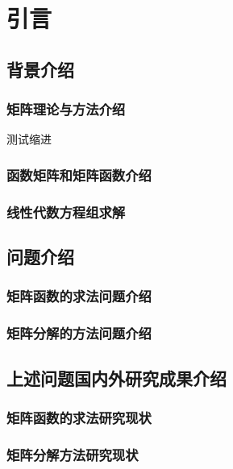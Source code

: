 \section{引言}
\fontsize{12pt}{14pt}\selectfont
\songti
    \subsection{背景介绍}
        \subsubsection{矩阵理论与方法介绍}
            \par 测试缩进 


        \subsubsection{函数矩阵和矩阵函数介绍}



        \subsubsection{线性代数方程组求解}


        
    \subsection{问题介绍}
        \subsubsection{矩阵函数的求法问题介绍}

        

        \subsubsection{矩阵分解的方法问题介绍}




    \subsection{上述问题国内外研究成果介绍}
        \subsubsection{矩阵函数的求法研究现状}



        \subsubsection{矩阵分解方法研究现状}




